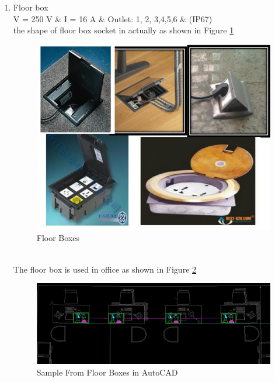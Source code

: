 \documentclass[12pt,fleqn]{book} %
\begin{document}
\begin{enumerate}
    \item Floor box 
    \\ V = 250 V \& I = 16 A \& Outlet: 1, 2, 3,4,5,6 \& (IP67)
    \\ the shape of floor box socket in actually as shown in  Figure \ref{fig:s 8}
    \begin{figure}[h!]
    \centering
    \includegraphics[width=0.7\linewidth]{s 8.png}
    \caption{  Floor Boxes  }
    \label{fig:s 8}
\end{figure}
\\ The floor box is used in office as shown in Figure \ref{fig:s 11}
\begin{figure}[h!]
    \centering
    \includegraphics[width=0.7\linewidth]{s 11.png}
    \caption{  Sample From Floor Boxes in AutoCAD }
    \label{fig:s 11}
\end{figure}
  
\end{enumerate}
\newpage
\end{document}
